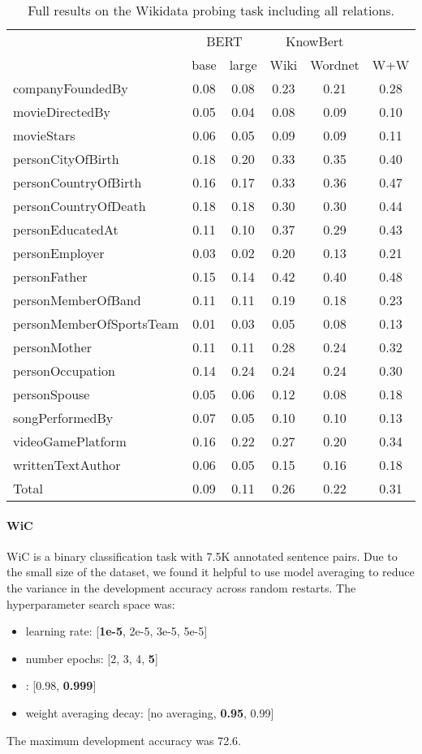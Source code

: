 \documentclass[11pt,a4paper]{article}
\begin{document}
\begin{table*}[t]
\centering
\begin{tabular}{l c c | c c c}
\toprule
 & \multicolumn{2}{c|}{BERT}  & \multicolumn{2}{c}{KnowBert} \\
 & base & large & Wiki & Wordnet & W+W \\
 \midrule
 companyFoundedBy & 0.08 & 0.08 & 	0.23 & 0.21 & 0.28 \\
movieDirectedBy	& 0.05 & 0.04 & 0.08 & 0.09 & 0.10\\
movieStars &	0.06 &	0.05&	0.09& 0.09&	0.11\\
personCityOfBirth&	0.18&	0.20&	0.33& 0.35 & 0.40\\
personCountryOfBirth&	0.16&	0.17&	0.33& 0.36 &	0.47 \\
personCountryOfDeath&	0.18&	0.18&	0.30& 0.30 &	0.44 \\
personEducatedAt&	0.11&	0.10	&0.37& 0.29 &	0.43 \\
personEmployer&	0.03& 	0.02&	0.20& 0.13 &	0.21 \\
personFather&	0.15&	0.14&	0.42& 0.40 &	0.48 \\
personMemberOfBand&	0.11&	0.11&	0.19 &0.18	&0.23 \\
personMemberOfSportsTeam&	0.01&	0.03 & 0.05	&0.08&	0.13\\
personMother&	0.11&	0.11&	0.28& 0.24 &	0.32\\
personOccupation&	0.14&	0.24&	0.24& 0.24 &	0.30\\
personSpouse&	0.05&	0.06&	0.12& 0.08 &	0.18\\
songPerformedBy&	0.07&	0.05&	0.10& 0.10 &	0.13\\
videoGamePlatform	&0.16&	0.22&	0.27& 0.20 &	0.34\\
writtenTextAuthor&	0.06&	0.05&	0.15& 0.16 &	0.18\\
\midrule
Total &	0.09	& 0.11 &	0.26 & 0.22	& 0.31\\
\bottomrule
\end{tabular}\caption{Full results on the Wikidata probing task including all relations.
}
\label{tab:kg_probe_full}
\end{table*}


\paragraph{WiC}
WiC is a binary classification task with 7.5K annotated sentence pairs.
Due to the small size of the dataset, we found it helpful to use model averaging to reduce the variance in the development accuracy across random restarts.
The hyperparameter search space was:
\begin{itemize}
    \item learning rate: [\textbf{1e-5}, 2e-5, 3e-5, 5e-5]
    \item number epochs: [2, 3, 4, \textbf{5}]
    \item : [0.98, \textbf{0.999}]
    \item weight averaging decay: [no averaging, \textbf{0.95}, 0.99]
\end{itemize}
The maximum development accuracy was 72.6.
\end{document}
